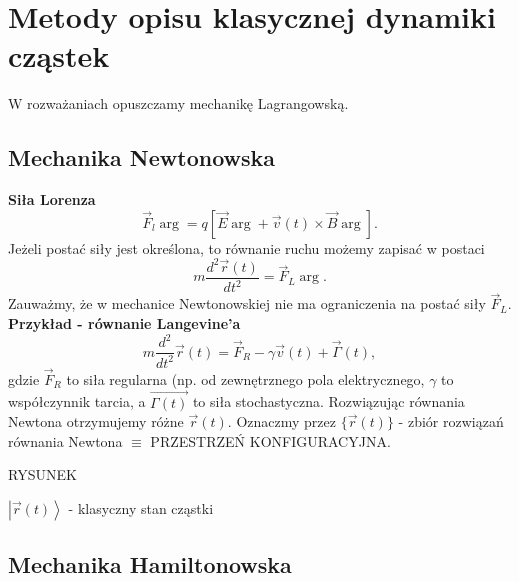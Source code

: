 \section{Metody opisu klasycznej dynamiki cząstek}
W rozważaniach opuszczamy mechanikę Lagrangowską. 
\subsection{Mechanika Newtonowska}
\textbf{Siła Lorenza}
\begin{equation}\label{sila_lorenza}
	\vec{F}_l \arg = q [ \vec{E} \arg+\vec{v}(t)\times\vec{B}\arg].
\end{equation}
Jeżeli postać siły jest określona, to równanie ruchu możemy 
zapisać w postaci
\begin{equation}
	m\frac{d^2\vec{r}(t)}{dt^2}=\vec{F}_L \arg  .
\end{equation}
Zauważmy, że w mechanice Newtonowskiej nie ma ograniczenia na 
postać siły $\vec{F}_L$.
\textbf{Przykład - równanie Langevine'a}
$$ m\frac{d^2}{dt^2} \vec{r}(t) = \vec{F}_R - \gamma\vec{v}(t) +
\vec{\Gamma}(t),$$
gdzie $\vec{F}_R$ to siła regularna (np. od zewnętrznego pola 
elektrycznego, $\gamma$ to współczynnik tarcia, a $\vec{\Gamma(t)}$ 
to siła stochastyczna.
Rozwiązując równania Newtona otrzymujemy różne $\vec{r}(t)$. 
Oznaczmy przez $\{ \vec{r}(t) \}$ - zbiór rozwiązań równania Newtona
$\equiv$ PRZESTRZEŃ KONFIGURACYJNA.

RYSUNEK


$\left|\vec{r}(t)\right> $ - klasyczny stan cząstki 


\subsection{Mechanika Hamiltonowska}

